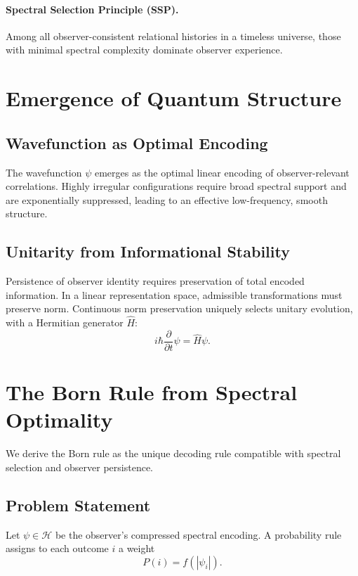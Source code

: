 \documentclass[11pt]{article}
\begin{document}
\paragraph{Spectral Selection Principle (SSP).}
Among all observer-consistent relational histories in a timeless universe,
those with minimal spectral complexity dominate observer experience.

\section{Emergence of Quantum Structure}

\subsection{Wavefunction as Optimal Encoding}

The wavefunction \( \psi \) emerges as the optimal linear encoding of observer-relevant correlations.
Highly irregular configurations require broad spectral support and are exponentially suppressed,
leading to an effective low-frequency, smooth structure.

\subsection{Unitarity from Informational Stability}

Persistence of observer identity requires preservation of total encoded information.
In a linear representation space, admissible transformations must preserve norm.
Continuous norm preservation uniquely selects unitary evolution,
with a Hermitian generator \( \hat{H} \):
\begin{equation}
i\hbar \frac{\partial}{\partial t}\psi = \hat{H}\psi.
\end{equation}

\section{The Born Rule from Spectral Optimality}

We derive the Born rule as the unique decoding rule compatible with
spectral selection and observer persistence.

\subsection{Problem Statement}

Let \( \psi \in \mathcal{H} \) be the observer's compressed spectral encoding.
A probability rule assigns to each outcome \( i \) a weight
\begin{equation}
P(i) = f(|\psi_i|).
\end{equation}
\end{document}

